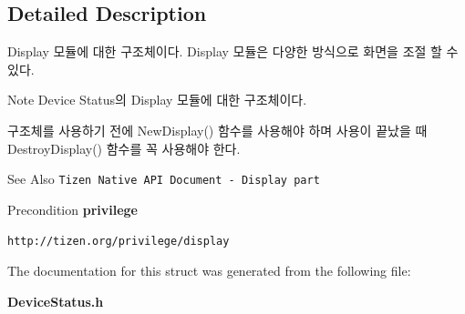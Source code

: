 \subsection{Detailed Description}
Display 모듈에 대한 구조체이다. Display 모듈은 다양한 방식으로 화면을 조절 할 수 있다. 

\begin{DoxyNote}{Note}
Device Status의 Display 모듈에 대한 구조체이다. \par
 구조체를 사용하기 전에 New\-Display() 함수를 사용해야 하며 사용이 끝났을 때 Destroy\-Display() 함수를 꼭 사용해야 한다. 
\end{DoxyNote}
\begin{DoxySeeAlso}{See Also}
{\tt Tizen Native A\-P\-I Document -\/ Display part} 
\end{DoxySeeAlso}
\begin{DoxyPrecond}{Precondition}
{\bfseries privilege} \par

\begin{DoxyItemize}
\item {\tt http\-://tizen.\-org/privilege/display} 
\end{DoxyItemize}
\end{DoxyPrecond}


The documentation for this struct was generated from the following file\-:\begin{DoxyCompactItemize}
\item 
{\bf Device\-Status.\-h}\end{DoxyCompactItemize}
